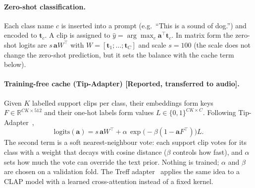 \paragraph{Zero-shot classification.}
Each class name $c$ is inserted into a prompt (e.g.\ ``This is a sound of dog.'') and encoded to $\mathbf{t}_c$.
A clip is assigned to $\hat y = \arg\max_c \mathbf{a}^\top\mathbf{t}_c$. In matrix form the zero-shot logits are $s\,\mathbf{a}W^\top$ with
$W=[\mathbf{t}_1;\dots;\mathbf{t}_C]$ and scale $s=100$ (the scale does not change the zero-shot prediction, but it sets the balance with the cache term below).

\paragraph{Training-free cache (Tip-Adapter) [Reported, transferred to audio].}
Given $K$ labelled support clips per class, their embeddings form keys $F\in\mathbb{R}^{CK\times 512}$ and their one-hot labels form values
$L\in\{0,1\}^{CK\times C}$. Following Tip-Adapter~\cite{zhang2022tip},
\[
  \text{logits}(\mathbf{a}) = s\,\mathbf{a}W^\top + \alpha\,\exp\!\big(-\beta(1-\mathbf{a}F^\top)\big)L .
\]
The second term is a soft nearest-neighbour vote: each support clip votes for its class with a weight that decays with cosine distance
($\beta$ controls how fast), and $\alpha$ sets how much the vote can override the text prior. Nothing is trained; $\alpha$ and $\beta$ are chosen on a validation fold.
The Treff adapter~\cite{liang2023treff} applies the same idea to a CLAP model with a learned cross-attention instead of a fixed kernel.
